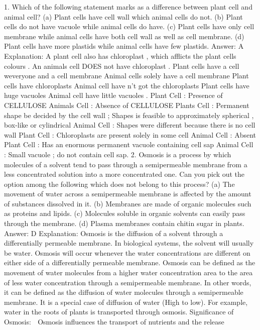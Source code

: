 

1. Which of the following statement marks as a difference
between plant cell and animal cell?
(a) Plant cells have cell wall which animal cells do not.
(b) Plant cells do not have vacuole while animal cells do have.
(c) Plant cells have only cell membrane while animal cells have both
cell wall as well as cell membrane.
(d) Plant cells have more plastids while animal cells have few plastids.
Answer: A
Explanation: A plant cell also has chloroplast , which afflicts the
plant cells colours . An animals cell DOES not have chloroplast . Plant
cells have a cell weveryone and a cell membrane Animal cells solely
have a cell membrane Plant cells have chloroplasts Animal cell have
n't got the chloroplasts Plant cells have huge vacuoles Animal cell
have little vacuoles . Plant Cell : Presence of CELLULOSE Animals
Cell : Absence of CELLULOSE Plants Cell : Permanent shape be
decided by the cell wall ; Shapes is feasible to approximately
spherical , box-like or cylindrical Animal Cell : Shapes were different
because there is no cell wall Plant Cell : Chloroplasts are present
solely in some cell Animal Cell : Absent Plant Cell : Has an enormous
permanent vacuole containing cell sap Animal Cell : Small vacuole ; do
not contain cell sap.
2. Osmosis is a process by which molecules of a solvent tend to
pass through a semipermeable membrane from a less
concentrated solution into a more concentrated one. Can you pick
out the option among the following which does not belong to this
process?
(a) The movement of water across a semipermeable membrane is
affected by the amount of substances dissolved in it.
(b) Membranes are made of organic molecules such as proteins and
lipids.
(c) Molecules soluble in organic solvents can easily pass through the
membrane.
(d) Plasma membranes contain chitin sugar in plants.
Answer: D
Explanation: Osmosis is the diffusion of a solvent through a
differentially permeable membrane. In biological systems,
the solvent will usually be water. Osmosis will occur whenever the
water concentrations are different on either side of a differentially
permeable membrane.
Osmosis can be defined as the movement of water molecules from a
higher water concentration area to the area of less water
concentration through a semipermeable membrane. In other words,
it can be defined as the diffusion of water molecules through a
semipermeable membrane. It is a special case of diffusion of water
(High to low). For example, water in the roots of plants is
transported through osmosis.
Significance of Osmosis:
 Osmosis influences the transport of nutrients and the release
